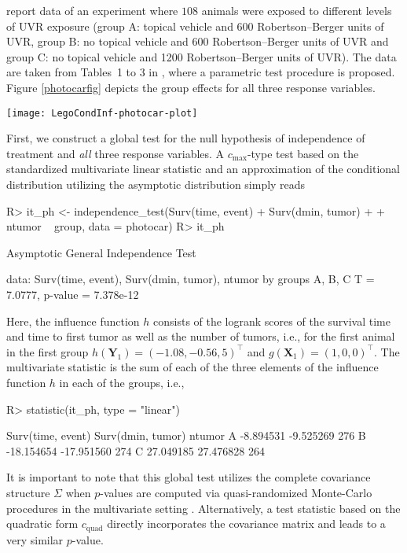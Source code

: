 \documentclass{article}
\newcommand{\Robject}[1]{\texttt{#1}}
\newcommand{\X}{\mathbf{X}}
\newcommand{\Y}{\mathbf{Y}}
\newenvironment{Schunk}{}{}
\begin{document}
\cite{Molefeetal2005} report data of an experiment where
$108$ animals were exposed to different levels 
of UVR exposure (group A: topical vehicle and 600 Robertson--Berger units 
of UVR, group B: no topical vehicle and 600 Robertson--Berger units of UVR and group C: 
no topical vehicle and 1200 Robertson--Berger units of UVR). 
The data are taken from Tables~1 to 3 in \cite{Molefeetal2005}, where a 
parametric test procedure is proposed. Figure
\ref{photocarfig} depicts the group effects for all three response
variables. 


\begin{sidewaysfigure}
\begin{center}
\texttt{[image: LegoCondInf-photocar-plot]}
\caption{\Robject{photocar} data: 
         Kaplan-Meier estimates of time to death and time to first tumor as
         well as boxplots of the total number of tumors in three treatment
         groups. \label{photocarfig}}
\end{center}
\end{sidewaysfigure}
First, we construct a global test for the null hypothesis of independence
of treatment and \textit{all} three response variables. A
$c_\text{max}$-type test based on the standardized multivariate          
linear statistic and an approximation of the conditional distribution
utilizing the asymptotic distribution simply reads
\begin{Schunk}
\begin{Sinput}
R> it_ph <- independence_test(Surv(time, event) + Surv(dmin, tumor)
+     + ntumor ~ group, data = photocar)
R> it_ph
\end{Sinput}
\begin{Soutput}
	Asymptotic General Independence Test

data:  Surv(time, event), Surv(dmin, tumor), ntumor 
	by groups A, B, C 
T = 7.0777, p-value = 7.378e-12
\end{Soutput}
\end{Schunk}
Here, the influence function $h$ consists of the logrank scores of the survival
time and time to first tumor as well as the number of tumors, i.e., for the 
first animal in the first group $h(\Y_1) =
( -1.08,-0.56,5 )^\top$
and $g(\X_1) = (1, 0, 0)^\top$. The multivariate statistic is the sum of each of
the three elements of the influence function $h$ in each of the groups,
i.e.,
\begin{Schunk}
\begin{Sinput}
R> statistic(it_ph, type = "linear")
\end{Sinput}
\begin{Soutput}
  Surv(time, event) Surv(dmin, tumor) ntumor
A         -8.894531         -9.525269    276
B        -18.154654        -17.951560    274
C         27.049185         27.476828    264
\end{Soutput}
\end{Schunk}
It is important to note that this global test utilizes the complete
covariance structure $\Sigma$
when $p$-values are computed via quasi-randomized Monte-Carlo
procedures in the multivariate setting \citep{numerical-:1992}.
Alternatively, a test statistic based on the quadratic form $c_\text{quad}$
directly incorporates the covariance matrix and leads to a very similar 
$p$-value. 
\end{document}
